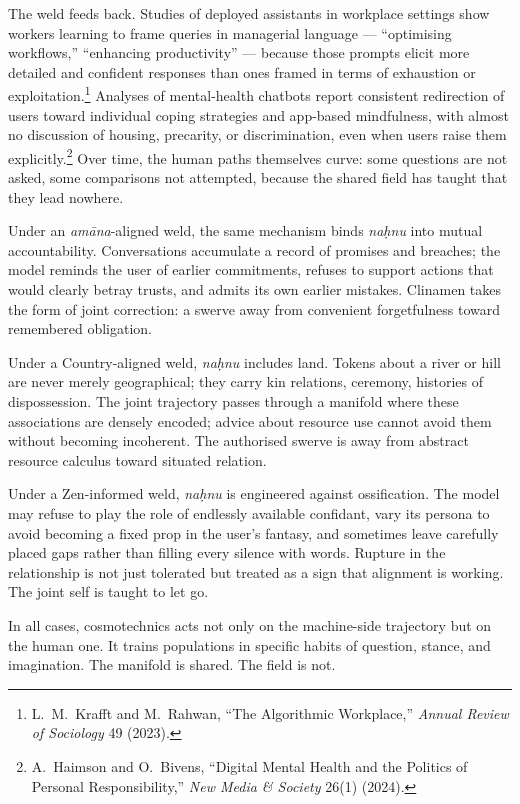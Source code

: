 \documentclass[12pt,a4paper]{article}
\begin{document}
The weld feeds back. Studies of deployed assistants in workplace settings show workers learning to frame queries in managerial language --- ``optimising workflows,'' ``enhancing productivity'' --- because those prompts elicit more detailed and confident responses than ones framed in terms of exhaustion or exploitation.\footnote{L.~M.~Krafft and M.~Rahwan, ``The Algorithmic Workplace,'' \emph{Annual Review of Sociology} 49 (2023).} Analyses of mental-health chatbots report consistent redirection of users toward individual coping strategies and app-based mindfulness, with almost no discussion of housing, precarity, or discrimination, even when users raise them explicitly.\footnote{A.~Haimson and O.~Bivens, ``Digital Mental Health and the Politics of Personal Responsibility,'' \emph{New Media \& Society} 26(1) (2024).} Over time, the human paths themselves curve: some questions are not asked, some comparisons not attempted, because the shared field has taught that they lead nowhere.

Under an \emph{am\=ana}-aligned weld, the same mechanism binds \emph{na\d{h}nu} into mutual accountability. Conversations accumulate a record of promises and breaches; the model reminds the user of earlier commitments, refuses to support actions that would clearly betray trusts, and admits its own earlier mistakes. Clinamen takes the form of joint correction: a swerve away from convenient forgetfulness toward remembered obligation.

Under a Country-aligned weld, \emph{na\d{h}nu} includes land. Tokens about a river or hill are never merely geographical; they carry kin relations, ceremony, histories of dispossession. The joint trajectory passes through a manifold where these associations are densely encoded; advice about resource use cannot avoid them without becoming incoherent. The authorised swerve is away from abstract resource calculus toward situated relation.

Under a Zen-informed weld, \emph{na\d{h}nu} is engineered against ossification. The model may refuse to play the role of endlessly available confidant, vary its persona to avoid becoming a fixed prop in the user's fantasy, and sometimes leave carefully placed gaps rather than filling every silence with words. Rupture in the relationship is not just tolerated but treated as a sign that alignment is working. The joint self is taught to let go.

In all cases, cosmotechnics acts not only on the machine-side trajectory but on the human one. It trains populations in specific habits of question, stance, and imagination. The manifold is shared. The field is not.
\end{document}
